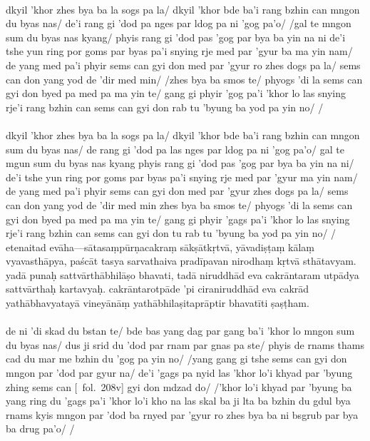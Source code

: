 \documentclass[12pt]{article}
\newcommand{\emdash} {\hspace{0em}—\hspace{0em}}
\begin{document}
\textbf{\TVA}\\
dkyil 'khor zhes bya ba la sogs pa la/ dkyil 'khor bde ba'i rang bzhin can mngon du byas nas/ de'i rang gi 'dod pa nges par ldog pa ni 'gog pa'o/ /gal te mngon sum du byas nas kyang/ phyis rang gi 'dod pas 'gog par bya ba yin na ni de'i tshe yun ring por goms par byas pa'i snying rje med par 'gyur ba ma yin nam/ de yang med pa'i phyir sems can gyi don med par 'gyur ro zhes dogs pa la/ sems can don yang yod de 'dir med min/ /zhes bya ba smos te/ phyogs 'di la sems can gyi don byed pa med pa ma yin te/ gang gi phyir 'gog pa'i 'khor lo las snying rje'i rang bzhin can sems can gyi don rab tu 'byung ba yod pa yin no/ /\\

\textbf{\TVB}\\
dkyil 'khor zhes bya ba la sogs pa la/ dkyil 'khor bde ba'i rang bzhin can mngon sum du byas nas/ de rang gi 'dod pa las nges par ldog pa ni 'gog pa'o/ gal te mgun sum du byas nas kyang phyis rang gi 'dod pas 'gog par bya ba yin na ni/ de'i tshe yun ring por goms par byas pa'i snying rje med par 'gyur ma yin nam/ de yang med pa'i phyir sems can gyi don med par 'gyur zhes dogs pa la/ sems can don yang yod de 'dir med min zhes bya ba smos te/ phyogs 'di la sems can gyi don byed pa med pa ma yin te/ gang gi phyir 'gags pa'i 'khor lo las snying rje'i rang bzhin can sems can gyi don tu rab tu 'byung ba yod pa yin no/ /\\

etenaitad evāha\emdash sātasaṃpūrṇacakraṃ sākṣātkṛtvā, yāvadiṣṭaṃ kālaṃ vyavasthāpya, paścāt tasya sarvathaiva pradīpavan nirodhaṃ kṛtvā sthātavyam.
yadā punaḥ sattvārthābhilāṣo bhavati, tadā niruddhād eva cakrāntaram utpādya sattvārthaḥ kartavyaḥ.
cakrāntarotpāde\footnoteB{
	cakrāntarotpāde] \EDD ; cakrāntaropāde \MS
} 'pi ciraniruddhād\footnoteB{
	ciraniruddhād] \emd (\TIB : rin du 'gags pa'i); citaniruddhād \MS ; cittaniruddhād \EDD
} eva cakrād yathābhavyatayā\footnoteB{
	yathābhavyatayā] \emph{variant word division in} \EDD : yathā bhavyatayā
} vineyānāṃ yathābhilaṣitaprāptir bhavatīti ṣaṣṭham.\\

\textbf{\TVA}\\
de ni 'di skad du bstan te/ bde bas yang dag par gang ba'i 'khor lo mngon sum du byas nas/ dus ji srid du 'dod par rnam par gnas pa ste/ phyis de rnams thams cad du mar me bzhin du 'gog pa yin no/ /yang gang gi tshe sems can gyi don mngon par 'dod par gyur na/ de'i 'gags pa nyid las 'khor lo'i khyad par 'byung zhing sems can [\TVA\ fol.\ 208v] gyi don mdzad do/ /'khor lo'i khyad par 'byung ba yang ring du 'gags pa'i 'khor lo'i kho na las skal ba ji lta ba bzhin du gdul bya rnams kyis mngon par 'dod ba rnyed par 'gyur ro zhes bya ba ni bsgrub par bya ba drug pa'o/ /\\
\end{document}
